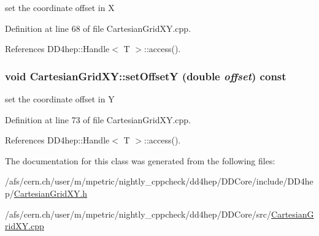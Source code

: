 set the coordinate offset in X 

Definition at line 68 of file CartesianGridXY.cpp.

References DD4hep::Handle$<$ T $>$::access().\hypertarget{class_d_d4hep_1_1_geometry_1_1_cartesian_grid_x_y_aaa47fc94a51e4c00b1aeebba4a9e852c}{
\subsubsection[{setOffsetY}]{\setlength{\rightskip}{0pt plus 5cm}void CartesianGridXY::setOffsetY (double {\em offset}) const}}
\label{class_d_d4hep_1_1_geometry_1_1_cartesian_grid_x_y_aaa47fc94a51e4c00b1aeebba4a9e852c}


set the coordinate offset in Y 

Definition at line 73 of file CartesianGridXY.cpp.

References DD4hep::Handle$<$ T $>$::access().

The documentation for this class was generated from the following files:\begin{DoxyCompactItemize}
\item 
/afs/cern.ch/user/m/mpetric/nightly\_\-cppcheck/dd4hep/DDCore/include/DD4hep/\hyperlink{_d_d_core_2include_2_d_d4hep_2_cartesian_grid_x_y_8h}{CartesianGridXY.h}\item 
/afs/cern.ch/user/m/mpetric/nightly\_\-cppcheck/dd4hep/DDCore/src/\hyperlink{_d_d_core_2src_2_cartesian_grid_x_y_8cpp}{CartesianGridXY.cpp}\end{DoxyCompactItemize}
